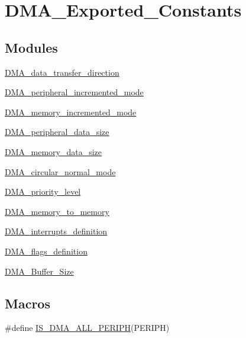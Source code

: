 \hypertarget{group___d_m_a___exported___constants}{}\section{D\+M\+A\+\_\+\+Exported\+\_\+\+Constants}
\label{group___d_m_a___exported___constants}
\subsection*{Modules}
\begin{DoxyCompactItemize}
\item 
\mbox{\hyperlink{group___d_m_a__data__transfer__direction}{D\+M\+A\+\_\+data\+\_\+transfer\+\_\+direction}}
\item 
\mbox{\hyperlink{group___d_m_a__peripheral__incremented__mode}{D\+M\+A\+\_\+peripheral\+\_\+incremented\+\_\+mode}}
\item 
\mbox{\hyperlink{group___d_m_a__memory__incremented__mode}{D\+M\+A\+\_\+memory\+\_\+incremented\+\_\+mode}}
\item 
\mbox{\hyperlink{group___d_m_a__peripheral__data__size}{D\+M\+A\+\_\+peripheral\+\_\+data\+\_\+size}}
\item 
\mbox{\hyperlink{group___d_m_a__memory__data__size}{D\+M\+A\+\_\+memory\+\_\+data\+\_\+size}}
\item 
\mbox{\hyperlink{group___d_m_a__circular__normal__mode}{D\+M\+A\+\_\+circular\+\_\+normal\+\_\+mode}}
\item 
\mbox{\hyperlink{group___d_m_a__priority__level}{D\+M\+A\+\_\+priority\+\_\+level}}
\item 
\mbox{\hyperlink{group___d_m_a__memory__to__memory}{D\+M\+A\+\_\+memory\+\_\+to\+\_\+memory}}
\item 
\mbox{\hyperlink{group___d_m_a__interrupts__definition}{D\+M\+A\+\_\+interrupts\+\_\+definition}}
\item 
\mbox{\hyperlink{group___d_m_a__flags__definition}{D\+M\+A\+\_\+flags\+\_\+definition}}
\item 
\mbox{\hyperlink{group___d_m_a___buffer___size}{D\+M\+A\+\_\+\+Buffer\+\_\+\+Size}}
\end{DoxyCompactItemize}
\subsection*{Macros}
\begin{DoxyCompactItemize}
\item 
\#define \mbox{\hyperlink{group___d_m_a___exported___constants_gabcab9fa1c48b148703a8f41c1d99e0c8}{I\+S\+\_\+\+D\+M\+A\+\_\+\+A\+L\+L\+\_\+\+P\+E\+R\+I\+PH}}(P\+E\+R\+I\+PH)
\end{DoxyCompactItemize}


